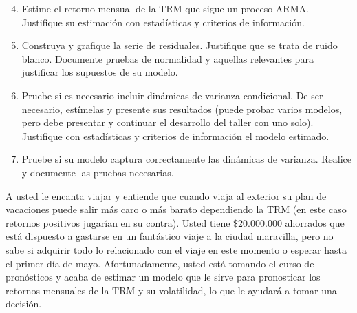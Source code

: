 \documentclass{article}
\theoremstyle{remark}
\theoremstyle{definition}
\begin{document}
\begin{enumerate}[label = \emph{\alph*})]\setcounter{enumi}{3}
    \item {Estime el retorno mensual de la TRM que sigue un proceso ARMA. Justifique su estimaci\'on con estad\'isticas y criterios de informaci\'on.}
        \begin{tcolorbox}[title=Soluci\'on 2.d]
            
        \end{tcolorbox}
    \item {Construya y grafique la serie de residuales. Justifique que se trata de ruido blanco. Documente pruebas de normalidad y aquellas relevantes para justificar los supuestos de su modelo.}
        \begin{tcolorbox}[title=Soluci\'on 2.e]
            
        \end{tcolorbox}
    \item {Pruebe si es necesario incluir din\'amicas de varianza condicional. De ser necesario, est\'imelas y presente sus resultados (puede probar varios modelos, pero debe presentar y continuar el desarrollo del taller con uno solo). Justifique con estad\'isticas y criterios de informaci\'on el modelo estimado.}
        \begin{tcolorbox}[title=Soluci\'on 2.f]
            
        \end{tcolorbox}
    \item {Pruebe si su modelo captura correctamente las din\'amicas de varianza. Realice y documente las pruebas necesarias.}
        \begin{tcolorbox}[title=Soluci\'on 2.g]
            
        \end{tcolorbox}
\end{enumerate}

{A usted le encanta viajar y entiende que cuando viaja al exterior su plan de vacaciones puede salir m\'as caro o m\'as barato dependiendo la TRM (en este caso retornos positivos jugar\'ian en su contra). Usted tiene $\$20.000.000$ ahorrados que est\'a dispuesto a gastarse en un fant\'astico viaje a la ciudad maravilla, pero no sabe si adquirir todo lo relacionado con el viaje en este momento o esperar hasta el primer d\'ia de mayo. Afortunadamente, usted est\'a tomando el curso de pron\'osticos y acaba de estimar un modelo que le sirve para pronosticar los retornos mensuales de la TRM y su volatilidad, lo que le ayudar\'a a tomar una decisi\'on.}
\end{document}
